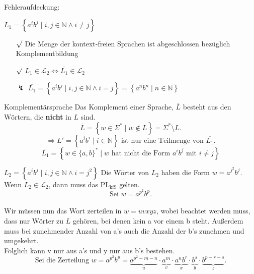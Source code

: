 \documentclass[]{beamer}
\begin{document}
\begin{frame}[squeeze]{}
  Fehleraufdeckung:
  \begin{exampleblock}{$L_1 = \left\{ a^i b^j \;|\; i, j \in \mathbb{N} \wedge i \neq j \right\}$}
    \begin{itemize}
      \item[$\surd$] Die Menge der kontext-freien Sprachen ist abgeschlossen bezüglich Komplementbildung
      \pause
      \item[$\surd$] $L_1 \in \mathcal{L}_2 \Leftrightarrow \overline{L_1} \in \mathcal{L}_2$
      \pause
      \item[$\lightning$] $\overline{L_1} = \left\{ a^i b^j \;|\; i, j \in \mathbb{N} \wedge i = j \right\} = \left\{ a^n b^n \;|\; n \in \mathbb{N} \right\}$
    \end{itemize}
  \end{exampleblock}

  \pause
  
  \begin{block}{Komplementärsprache}
    Das Komplement einer Sprache, $\overline{L}$ besteht aus den Wörtern, die \textbf{nicht} in $L$ sind.
    \[\overline{L} = \left\{ w \in \Sigma^* \;|\; w \notin L \right\} = \Sigma^* \setminus L.\]
    \[\Rightarrow L' = \left\{ a^i b^i \;|\; i \in \mathbb{N} \right\} \text{ ist nur eine Teilmenge von } \overline{L_1}.\]
    \[\overline{L_1} = \left\{ w \in \{a, b\}^* \;|\; w \text{ hat nicht die Form } a^ib^j \text{ mit } i \neq j \right\}\]
  \end{block}
\end{frame}

\begin{frame}[squeeze]{}
  \begin{exampleblock}{$L_2 = \left\{ a^i b^j \;|\; i, j \in \mathbb{N} \wedge i = j^2 \right\}$}
  Die Wörter von $L_2$ haben die Form $w = a^{j^2}b^j$. \\
  \pause
  \vspace*{0.5em}
  Wenn $L_2 \in \mathcal{L}_2$, dann muss das $\mathrm{PL_{kfS}}$ gelten. \\
  \pause
  \vspace*{0.5em}
  \[\text{Sei } w = a^{p^2}b^p.\] \\
  \pause
  \vspace*{0.5em}
  Wir müssen nun das Wort zerteilen in $w = uvxyz$, wobei beachtet werden muss, dass nur Wörter zu $L$ gehören, bei denen kein a vor einem b steht. Außerdem muss bei zunehmender Anzahl von a's auch die Anzahl der b's zunehmen und umgekehrt. \\
  \pause
  \vspace*{0.5em}
  Folglich kann v nur aus a's und y nur aus b's bestehen. \\
  \pause
  \vspace*{-0.5em}
  \[\text{Sei die Zerteilung } w = a^{p^2}b^p = \underbrace{a^{p^2-m-n}}_u \cdot \underbrace{a^m}_v \cdot \underbrace{a^nb^r}_x \cdot \underbrace{b^s}_y \cdot \underbrace{b^{p-r-s}}_z.\]
  \end{exampleblock}
\end{frame}
\end{document}
